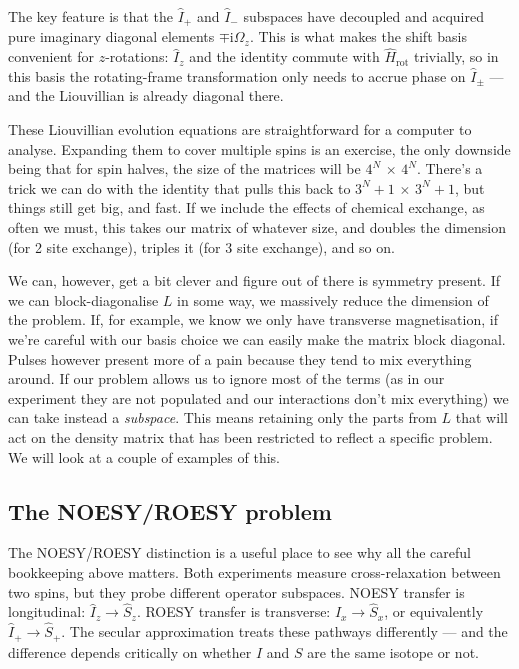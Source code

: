 \documentclass[notitlepage,11pt]{article}
\newcommand{\rmi}{\mathrm{i}}
\begin{document}
The key feature is that the $\hat{I}_+$ and $\hat{I}_-$ subspaces have decoupled and acquired pure imaginary diagonal elements $\mp\rmi\Omega_z$. This is what makes the shift basis convenient for $z$-rotations: $\hat{I}_z$ and the identity commute with $\hat{H}_{\mathrm{rot}}$ trivially, so in this basis the rotating-frame transformation only needs to accrue phase on $\hat{I}_\pm$ — and the Liouvillian is already diagonal there.

These Liouvillian evolution equations are straightforward for a computer to analyse. Expanding them to cover multiple spins is an exercise, the only downside being that for spin halves, the size of the matrices will be $4^N$ $\times$ $4^N$. There's a trick we can do with the identity that pulls this back to $3^N+1$ $\times$ $3^N+1$, but things still get big, and fast. If we include the effects of chemical exchange, as often we must, this takes our matrix of whatever size, and doubles the dimension (for 2 site exchange), triples it (for 3 site exchange), and so on.

We can, however, get a bit clever and figure out of there is symmetry present. If we can block-diagonalise $L$ in some way, we massively reduce the dimension of the problem. If, for example, we know we only have transverse magnetisation, if we're careful with our basis choice we can easily make the matrix block diagonal. Pulses however present more of a pain because they tend to mix everything around. If our problem allows us to ignore most of the terms (as in our experiment they are not populated and our interactions don't mix everything) we can take instead a \emph{subspace}. This means retaining only the parts from $L$ that will act on the density matrix that has been restricted to reflect a specific problem. We will look at a couple of examples of this.


\subsection{The NOESY/ROESY problem}

The NOESY/ROESY distinction is a useful place to see why all the careful bookkeeping above matters. Both experiments measure cross-relaxation between two spins, but they probe different operator subspaces. NOESY transfer is longitudinal: $\hat{I}_z\to\hat{S}_z$. ROESY transfer is transverse: $\hat{I}_x\to\hat{S}_x$, or equivalently $\hat{I}_+\to\hat{S}_+$. The secular approximation treats these pathways differently — and the difference depends critically on whether $I$ and $S$ are the same isotope or not.
\end{document}

